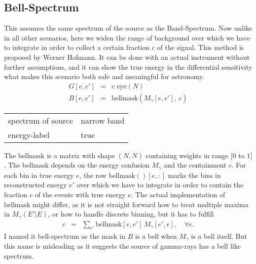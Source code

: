 \documentclass{article}%
\begin{document}
    \subsection{Bell-Spectrum}
    This assumes the same spectrum of the source as the Band-Spectrum.
    Now unlike in all other scenarios, here we widen the range of background over which we have to integrate in order to collect a certain fraction $c$ of the signal.
    This method is proposed by Werner Hofmann.
    It can be done with an actual instrument without further assumptions, and it can show the true energy in the differential sensitivity what makes this scenario both safe and meaningful for astronomy.
    \begin{eqnarray}
        G[e, e'] &=& c \, \, \mathrm{eye}(N)
        \\
        B[e, e'] &=& \mathrm{bellmask}(M_{\gamma}[e, e'], \, c)
    \end{eqnarray}
    \begin{center}
        \begin{tabular}{ll}
            spectrum of source & narrow band\\
            energy-label & true\\
        \end{tabular}
    \end{center}
    The $\mathrm{bellmask}$ is a matrix with shape $(N,N)$ containing weights in range $[0$ to $1]$.
    The $\mathrm{bellmask}$ depends on the energy confusion $M_{\gamma}$ and the containment $c$.
    For each bin in true energy $e$, the row $\mathrm{bellmask}()[e, :]$ marks the bins in reconstructed energy $e'$ over which we have to integrate in order to contain the fraction $c$ of the events with true energy $e$.
    The actual implementation of $\mathrm{bellmask}$ might differ, as it is not straight forward how to treat multiple maxima in $M_\gamma(E'\vert E)$, or how to handle discrete binning, but it has to fulfill
    \begin{eqnarray}
        c &=& \sum_{e'} \mathrm{bellmask}[e ,e'] \, M_{\gamma}[e', e], \,\,\,\,\,\, \forall e.
    \end{eqnarray}
    I named it bell-spectrum as the mask in $B$ is a bell when $M_\gamma$ is a bell itself. But this name is misleading as it suggests the source of gamma-rays has a bell like spectrum.
\end{document}
